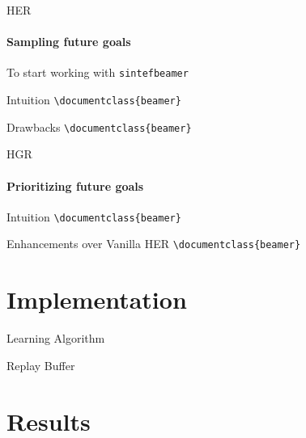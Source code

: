 \documentclass{beamer}
\begin{document}
      \begin{frame}[fragile]{HER}
            \framesubtitle{Sampling future goals}
            To start working with \texttt{sintefbeamer}
            \begin{block}{Intuition}
                  \verb|\documentclass{beamer}|\\
            \end{block}
            \begin{block}{Drawbacks}
                  \verb|\documentclass{beamer}|\\
            \end{block}
      \end{frame}

      \begin{frame}[fragile]{HGR}
            \framesubtitle{Prioritizing future goals}
            \begin{block}{Intuition}
                  \verb|\documentclass{beamer}|\\
            \end{block}
            \begin{block}{Enhancements over Vanilla HER}
                  \verb|\documentclass{beamer}|\\
            \end{block}
      \end{frame}


\section{Implementation}

      \begin{frame}{Learning Algorithm}
                  
      \end{frame}

      \begin{frame}{Replay Buffer}
                  
      \end{frame}


\section{Results}

\backmatter
\end{document}
